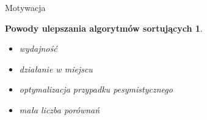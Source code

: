 \begin{frame}[squeeze]{Motywacja}

	\newtheorem*{sortimporove*}{Powody ulepszania algorytmów sortujących}
	\begin{sortimporove*}
		\begin{itemize}
			\item wydajność
			\item działanie w miejscu
			\item optymalizacja przypadku pesymistycznego
			\item mała liczba porównań
		\end{itemize}
	\end{sortimporove*}

\end{frame}